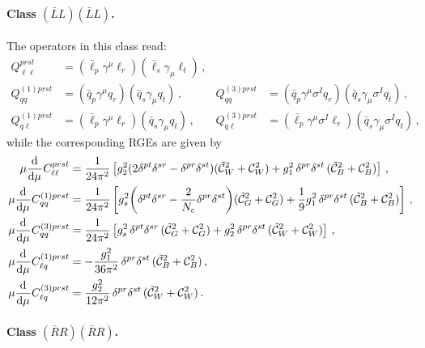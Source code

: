 \paragraph{Class $(\bar{L}L)(\bar{L}L)$.}

The operators in this class read:
\begin{align}
Q_{\ell \ell}^{prst} &= (\bar{\ell}_p \gamma^\mu \ell_r)(\bar{\ell}_s \gamma_\mu \ell_t)\,,&&\\ Q_{q q}^{(1)prst} &= (\bar{q}_p \gamma^\mu q_r)(\bar{q}_s \gamma_\mu q_t)\,,  &Q_{q q}^{(3)prst} &= (\bar{q}_p \gamma^\mu \sigma^I q_r)(\bar{q}_s \gamma_\mu \sigma^I q_t)\,,   \\
Q_{q \ell}^{(1)prst} &= (\bar{\ell}_p \gamma^\mu \ell_r)(\bar{q}_s \gamma_\mu q_t)\,,  &Q_{q \ell}^{(3)prst} &= (\bar{\ell}_p \gamma^\mu \sigma^I \ell_r)(\bar{q}_s \gamma_\mu \sigma^I q_t)\,,
\end{align}
while the corresponding RGEs are given by
\begin{align}
    \mu \dv[]{}{\mu}{C}_{\ell\ell}^{prst} &= \frac{1}{24\pi^2}\left[ g_2^2(2 \delta^{pt}\delta^{sr}- \delta^{pr}\delta^{st})(\tilde{\mathcal{C}}_{W}^2 + \mathcal{C}_{W}^2)+ g_1^2\, \delta^{pr}\delta^{st}\,(\tilde{\mathcal{C}}_{B}^2 + \mathcal{C}_{B}^2)\right]\, ,  \\
    \mu \dv[]{}{\mu}{C}_{qq}^{(1)prst} &=\frac{1}{24\pi^2}\left[ g_s^2\bigg(\delta^{pt}\delta^{sr}-\frac{2}{N_c} \delta^{pr}\delta^{st}\bigg)(\tilde{\mathcal{C}}_{G}^2 + \mathcal{C}_{G}^2)+ \frac{1}{9}g_1^2 \,\delta^{pr}\delta^{st}\,(\tilde{\mathcal{C}}_{B}^2 + \mathcal{C}_{B}^2)\right]\, , \\
    \mu \dv[]{}{\mu}{C}_{qq}^{(3)prst} &=\frac{1}{24\pi^2}\left[ g_s^2\,\delta^{pt}\delta^{sr}\,(\tilde{\mathcal{C}}_{G}^2 + \mathcal{C}_{G}^2)+ g_2^2\,\delta^{pr}\delta^{st}\,(\tilde{\mathcal{C}}_{W}^2 + \mathcal{C}_{W}^2)\right] \,, \\
    \mu \dv[]{}{\mu}{C}_{\ell q}^{(1)prst} &= -\frac{g_1^2}{36\pi^2}\,  \delta^{pr}\delta^{st}\,(\tilde{\mathcal{C}}_{B}^2 + \mathcal{C}_{B}^2)\, , \\
    \mu \dv[]{}{\mu}{C}_{\ell q}^{(3)prst} &=\frac{g_2^2}{12\pi^2}  \,\delta^{pr}\delta^{st}\,(\tilde{\mathcal{C}}_{W}^2 + \mathcal{C}_{W}^2)\,.
\end{align}
%

\paragraph{Class $(\bar{R}R)(\bar{R}R)$.}

